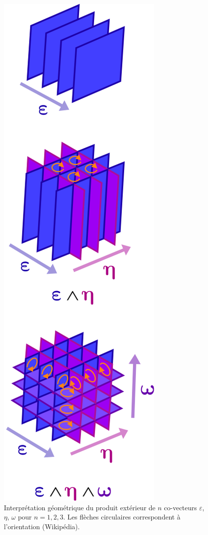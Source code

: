 \documentclass[french]{article}
\theoremstyle{definition}
\begin{document}
\begin{figure}[h!]
  \centering
  \includegraphics[scale=0.3]{figures/n-forme.png}
  \caption{Interprétation géométrique du produit extérieur de \(n\) co-vecteurs \(\varepsilon\), \(\eta\), \(\omega\) pour \(n = 1, 2, 3\). Les flèches circulaires correspondent à l'orientation (Wikipédia). }
  \label{n-forme}
\end{figure}
\end{document}
